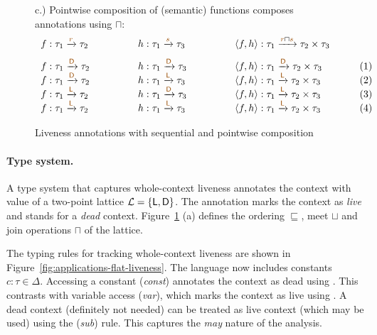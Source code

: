 \begin{figure}
{\small c.) Pointwise composition of (semantic) functions composes annotations using $\sqcap$:}
\begin{equation*}
\begin{array}{llll}
f : \tau_1 \xrightarrow{\aclrd{r}} \tau_2 \qquad\qquad&
h : \tau_1 \xrightarrow{\aclrd{s}} \tau_3 \qquad\qquad&
\langle f, h \rangle : \tau_1 \xrightarrow{\aclrd{r} \sqcap \aclrd{s}} \tau_2 \times \tau_3 \qquad&~
\\[0.75em]
f : \tau_1 \xrightarrow{\aclrd{ \ident{D} }} \tau_2 &
h : \tau_1 \xrightarrow{\aclrd{ \ident{D} }} \tau_3 &
\langle f, h \rangle : \tau_1 \xrightarrow{\aclrd{ \ident{D} }} \tau_2 \times \tau_3 & (1)
\\[-0.10em]
f : \tau_1 \xrightarrow{\aclrd{ \ident{D} }} \tau_2 &
h : \tau_1 \xrightarrow{\aclrd{ \ident{L} }} \tau_3 &
\langle f, h \rangle : \tau_1 \xrightarrow{\aclrd{ \ident{L} }} \tau_2 \times \tau_3 & (2)
\\[-0.10em]
f : \tau_1 \xrightarrow{\aclrd{ \ident{L} }} \tau_2 &
h : \tau_1 \xrightarrow{\aclrd{ \ident{D} }} \tau_3 &
\langle f, h \rangle : \tau_1 \xrightarrow{\aclrd{ \ident{L} }} \tau_2 \times \tau_3 & (3)
\\[-0.10em]
f : \tau_1 \xrightarrow{\aclrd{ \ident{L} }} \tau_2 &
h : \tau_1 \xrightarrow{\aclrd{ \ident{L} }} \tau_3 &
\langle f, h \rangle : \tau_1 \xrightarrow{\aclrd{ \ident{L} }} \tau_2 \times \tau_3 & (4)
\end{array}
\end{equation*}

\caption{Liveness annotations with sequential and pointwise composition}
\label{fig:applications-flat-livealg}
\end{figure}


\paragraph{Type system.}
A type system that captures whole-context liveness annotates the context with value of a 
two-point lattice $\mathcal{L} = \{ \ident{L}, \ident{D} \}$. The annotation  marks
the context as \emph{live} and  stands for a \emph{dead} context. 
Figure~\ref{fig:applications-flat-livealg} (a) defines the ordering $\sqsubseteq$, meet $\sqcup$ and join 
operations $\sqcap$ of the lattice.

The typing rules for tracking whole-context liveness are shown in Figure~\ref{fig:applications-flat-liveness}.
The language now includes constants $c:\tau \in \Delta$. Accessing a constant (\emph{const}) annotates
the context as dead using . This contrasts with variable access (\emph{var}), which marks the
context as live using . A dead context (definitely not needed) can be treated as live context
(which may be used) using the (\emph{sub}) rule. This captures the \emph{may} nature of the analysis.

